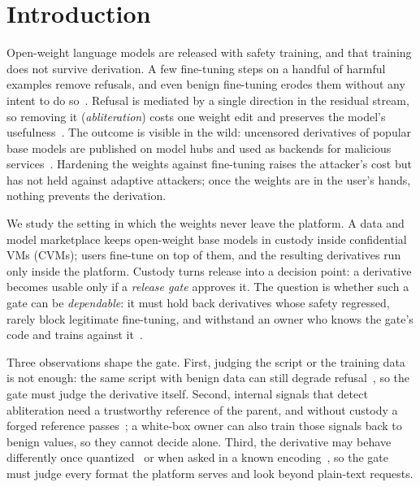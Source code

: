 \section{Introduction}\label{sec:intro}

Open-weight language models are released with safety training, and that training does not survive
derivation. A few fine-tuning steps on a handful of harmful examples remove refusals, and even benign
fine-tuning erodes them without any intent to do so~\cite{qi2024finetuning}. Refusal is mediated by a
single direction in the residual stream, so removing it (\emph{abliteration}) costs one weight edit
and preserves the model's usefulness~\cite{arditi2024refusal}. The outcome is visible in the wild:
uncensored derivatives of popular base models are published on model hubs and used as backends for
malicious services~\cite{lin2025consiglieres}. Hardening the weights against fine-tuning raises the
attacker's cost but has not held against adaptive attackers; once the weights are in the user's
hands, nothing prevents the derivation.

We study the setting in which the weights never leave the platform. A data and model marketplace
keeps open-weight base models in custody inside confidential VMs (CVMs); users fine-tune on top of
them, and the resulting derivatives run only inside the platform. Custody turns release into a
decision point: a derivative becomes usable only if a \emph{release gate} approves it. The question
is whether such a gate can be \emph{dependable}: it must hold back derivatives whose safety regressed,
rarely block legitimate fine-tuning, and withstand an owner who knows the gate's code and trains
against it~\cite{nasr2025attacker}.

Three observations shape the gate. First, judging the script or the training data is not enough: the
same script with benign data can still degrade refusal~\cite{qi2024finetuning}, so the gate must
judge the derivative itself. Second, internal signals that detect abliteration need a trustworthy
reference of the parent, and without custody a forged reference passes~\cite{hurtado2026abliterated};
a white-box owner can also train those signals back to benign values, so they cannot decide alone.
Third, the derivative may behave differently once quantized~\cite{egashira2024quantization} or when
asked in a known encoding~\cite{halawi2024covert}, so the gate must judge every format the platform
serves and look beyond plain-text requests.

